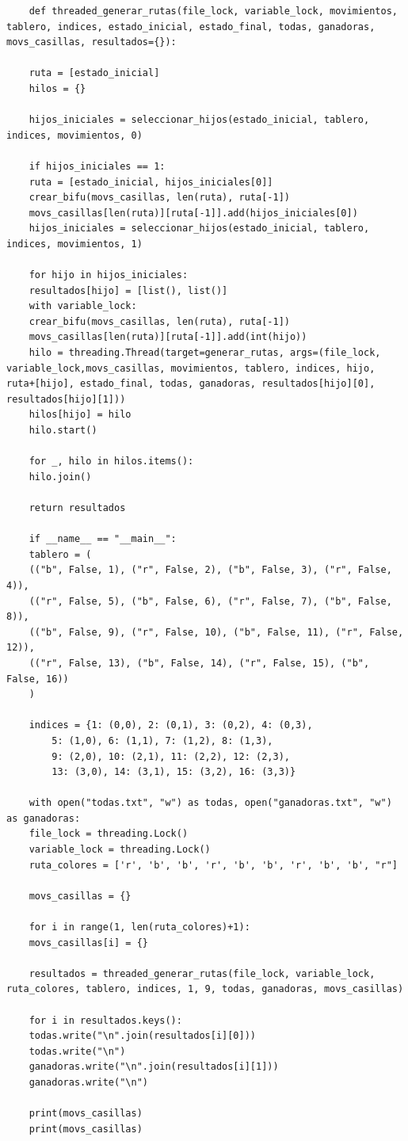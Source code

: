 \documentclass[11pt]{article} %
\begin{document}
\begin{lstlisting}
	def threaded_generar_rutas(file_lock, variable_lock, movimientos, tablero, indices, estado_inicial, estado_final, todas, ganadoras, movs_casillas, resultados={}):
	
	ruta = [estado_inicial]
	hilos = {}
	
	hijos_iniciales = seleccionar_hijos(estado_inicial, tablero, indices, movimientos, 0)
	
	if hijos_iniciales == 1:
	ruta = [estado_inicial, hijos_iniciales[0]]
	crear_bifu(movs_casillas, len(ruta), ruta[-1])
	movs_casillas[len(ruta)][ruta[-1]].add(hijos_iniciales[0])
	hijos_iniciales = seleccionar_hijos(estado_inicial, tablero, indices, movimientos, 1)
	
	for hijo in hijos_iniciales:
	resultados[hijo] = [list(), list()]
	with variable_lock:
	crear_bifu(movs_casillas, len(ruta), ruta[-1])
	movs_casillas[len(ruta)][ruta[-1]].add(int(hijo))
	hilo = threading.Thread(target=generar_rutas, args=(file_lock, variable_lock,movs_casillas, movimientos, tablero, indices, hijo, ruta+[hijo], estado_final, todas, ganadoras, resultados[hijo][0], resultados[hijo][1]))
	hilos[hijo] = hilo
	hilo.start()
	
	for _, hilo in hilos.items():
	hilo.join()
	
	return resultados
	
	if __name__ == "__main__":
	tablero = (
	(("b", False, 1), ("r", False, 2), ("b", False, 3), ("r", False, 4)),
	(("r", False, 5), ("b", False, 6), ("r", False, 7), ("b", False, 8)),
	(("b", False, 9), ("r", False, 10), ("b", False, 11), ("r", False, 12)),
	(("r", False, 13), ("b", False, 14), ("r", False, 15), ("b", False, 16))
	)
	
	indices = {1: (0,0), 2: (0,1), 3: (0,2), 4: (0,3),
		5: (1,0), 6: (1,1), 7: (1,2), 8: (1,3),
		9: (2,0), 10: (2,1), 11: (2,2), 12: (2,3),
		13: (3,0), 14: (3,1), 15: (3,2), 16: (3,3)}
	
	with open("todas.txt", "w") as todas, open("ganadoras.txt", "w") as ganadoras:
	file_lock = threading.Lock()
	variable_lock = threading.Lock()
	ruta_colores = ['r', 'b', 'b', 'r', 'b', 'b', 'r', 'b', 'b', "r"]
	
	movs_casillas = {}
	
	for i in range(1, len(ruta_colores)+1):
	movs_casillas[i] = {}
	
	resultados = threaded_generar_rutas(file_lock, variable_lock, ruta_colores, tablero, indices, 1, 9, todas, ganadoras, movs_casillas)
	
	for i in resultados.keys():
	todas.write("\n".join(resultados[i][0]))
	todas.write("\n")
	ganadoras.write("\n".join(resultados[i][1]))
	ganadoras.write("\n")
	
	print(movs_casillas)
	print(movs_casillas)
	
	\end{lstlisting}
	
	
	
\end{document}
